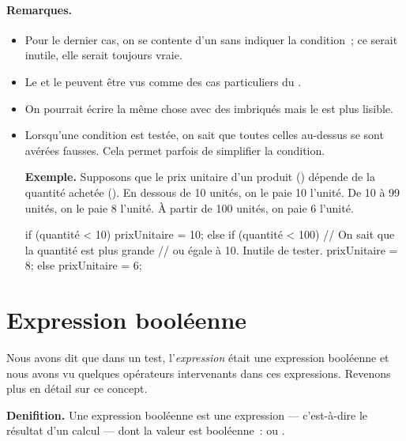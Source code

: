 	\paragraph{Remarques.}
	\begin{itemize}
	\item
		Pour le dernier cas, on se contente
		d’un  sans indiquer la condition~;
		ce serait inutile, elle serait toujours vraie.
	\item
		Le  et le  
		peuvent être vus comme des cas particuliers du 
		.
	\item
		On pourrait écrire la même chose 
		avec des  imbriqués
		mais le  est plus lisible.
	\item Lorsqu’une condition est testée, on sait que toutes celles au-dessus se
		sont avérées fausses.  Cela permet parfois de simplifier la condition.

		\textbf{Exemple.}
		Supposons que le prix unitaire d’un produit ()
		dépende de la quantité achetée (). 
		En dessous de 10 unités, on le paie 10\texteuro{} l’unité.
		De 10 à 99 unités, on le paie 8\texteuro{} l’unité.
		À partir de 100 unités, on paie 6\texteuro{} l’unité.

		\begin{java}
if (quantité < 10){
	prixUnitaire = 10;
} else if (quantité < 100) {
	// On sait que la quantité est plus grande
	// ou égale à 10. Inutile de tester. 
	prixUnitaire = 8;
} else {
	prixUnitaire = 6;
}
		\end{java}
		
	\end{itemize}


\section{Expression booléenne}
\label{expression booléenne}

Nous avons dit que dans un test, l'\textit{expression} était une expression
booléenne et nous avons vu quelques opérateurs intervenants dans ces
expressions.  Revenons plus en détail sur ce concept. 

\textbf{Denifition.} Une expression booléenne est une expression — c'est-à-dire
le résultat d'un calcul — dont la valeur est booléenne~:  ou
. 

